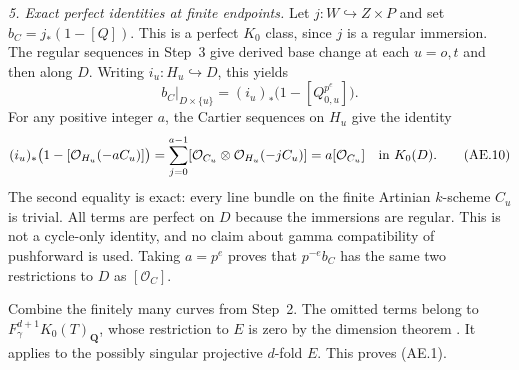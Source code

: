 \emph{5. Exact perfect identities at finite endpoints.}
Let $j:W\hookrightarrow Z\times P$ and set
$b_C=j_*(1-[Q])$.  This is a perfect $K_0$ class, since $j$ is
a regular immersion.  The regular sequences in Step~3 give
derived base change at each $u=o,t$ and then along $D$.
Writing $i_u:H_u\hookrightarrow D$, this yields
\[
       b_C|_{D\times\{u\}}
             =(i_u)_*\bigl(1-[Q_{0,u}^{p^e}]\bigr).
\]
For any positive integer $a$, the Cartier sequences on $H_u$
give the identity
\begin{equation}
 (i_u)_*\bigl(1-[\mathcal O_{H_u}(-aC_u)]\bigr)
       =\sum_{j=0}^{a-1}
            [\mathcal O_{C_u}\otimes\mathcal O_{H_u}(-jC_u)]
       =a[\mathcal O_{C_u}]\quad\hbox{in }K_0(D).       \tag{AE.10}
\end{equation}
The second equality is exact: every line bundle on the finite
Artinian $k$-scheme $C_u$ is trivial.  All terms are perfect
on $D$ because the immersions are regular.  This is not a
cycle-only identity, and no claim about gamma compatibility
of pushforward is used.  Taking $a=p^e$ proves that
$p^{-e}b_C$ has the same two restrictions to $D$ as
$[\mathcal O_C]$.

Combine the finitely many curves from Step~2.  The omitted terms
belong to $F_\gamma^{d+1}K_0(T)_{\mathbf Q}$, whose restriction
to $E$ is zero by the dimension theorem
\citep[Chapter II, Remark 8.8.5, p.~83]{D_Weibel2013KbookII}.
It applies to the possibly singular projective $d$-fold $E$.
This proves (AE.1).

